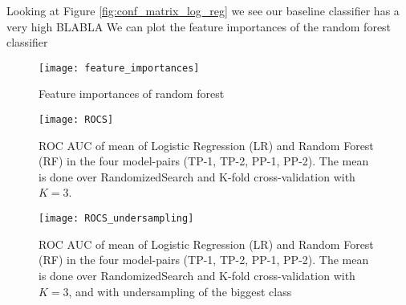 Looking at Figure \ref{fig:conf_matrix_log_reg} we see our baseline classifier has a very high BLABLA
We can plot the feature importances of the random forest classifier
\begin{figure}[H]
    \hspace*{-1.0cm}
    \centering
    \texttt{[image: feature\_importances]}
    \caption{Feature importances of random forest}
    \label{fig:feature_importances}
\end{figure}

\begin{figure}[H]
    \hspace*{-1.0cm}
    \centering
    \texttt{[image: ROCS]}
    \caption{ROC AUC of mean of Logistic Regression (LR) and Random Forest (RF) in the four model-pairs (TP-1, TP-2, PP-1, PP-2). The mean is done over RandomizedSearch and K-fold cross-validation with $K=3$. }
    \label{fig:rocs}
\end{figure}
\begin{figure}[H]
    \hspace*{-1.0cm}
    \centering
    \texttt{[image: ROCS\_undersampling]}
    \caption{ROC AUC of mean of Logistic Regression (LR) and Random Forest (RF) in the four model-pairs (TP-1, TP-2, PP-1, PP-2). The mean is done over RandomizedSearch and K-fold cross-validation with $K=3$, and with undersampling of the biggest class}
    \label{fig:rocs_undersampling}
\end{figure}